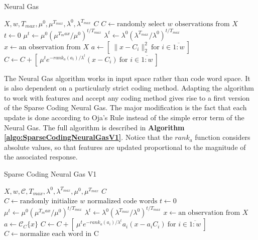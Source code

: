 \documentclass[runningheads,a4paper]{llncs}
\newcommand{\hcrange}[2]{\overline{{#1}\colon\!\!{#2}}}
\begin{document}
\begin{algorithm}
\caption{Neural Gas}
\label{algo:NeuralGas}
\begin{algorithmic}
\Require $X,w,T_{max},\mu^0,\mu^{T_{max}},\lambda^0,\lambda^{T_{max}}$
\Ensure $C$
\State $C \gets \mbox{randomly select $w$ observations from $X$}$
\State $t \gets 0$
\For {$t = \hcrange{1}{T_{max}}$}
\State $\mu^t \gets \mu^0 (\mu^{T_max} / \mu^0)^{t / T_{max}}$ 
\State $\lambda^t \gets \lambda^0 (\lambda^{T_{max}} / \lambda^0)^{t / T_{max}}$ 
\State $x \gets \text{an observation from $X$}$
\State $a \gets [ ~ \|x - C_i\|_2^2 ~ \mbox{for $i \in \hcrange{1}{w}$} ~ ]$
\State $C \gets C + [ ~ \mu^t e^{-rank_a(a_i) / \lambda^t} (x - C_i) ~ \mbox{for $i \in \hcrange{1}{w}$} ~ ]$
\EndFor
\end{algorithmic}
\end{algorithm}

The Neural Gas algorithm works in input space rather than code word space. It is also dependent on a particularly strict coding method. Adapting the algorithm to work with features and accept any coding method gives rise to a first version of the Sparse Coding Neural Gas. The major modification is the fact that each update is done according to Oja's Rule \cite{oja-rule} instead of the simple error term of the Neural Gas. The full algorithm is described in \textbf{Algorithm \ref{algo:SparseCodingNeuralGasV1}}. Notice that the $rank_a$ function considers absolute values, so that features are updated proportional to the magnitude of the associated response.

\begin{algorithm}
\caption{Sparse Coding Neural Gas V1}
\label{algo:SparseCodingNeuralGasV1}
\begin{algorithmic}
\Require $X,w,\mathcal{C},T_{max},\lambda^0,\lambda^{T_{max}},\mu^0,\mu^{T_{max}}$
\Ensure $C$
\State $C \gets \mbox{randomly initialize $w$ normalized code words}$
\State $t \gets 0$
\For {$t = \hcrange{1}{T_{max}}$}
\State $\mu^t \gets \mu^0 (\mu^{T_max} / \mu^0)^{t / T_{max}}$  
\State $\lambda^t \gets \lambda^0 (\lambda^{T_{max}} / \lambda^0)^{t / T_{max}}$ 
\State $x \gets \text{an observation from $X$}$
\State $a \gets \mathcal{C}_C\{ x \}$
\State $C \gets C + [ ~ \mu^t e^{-rank_a(a_i) / \lambda^t} a_i (x - a_i C_i) ~ \mbox{for $i \in \hcrange{1}{w}$} ~ ]$
\State $C \gets \mbox{normalize each word in C}$
\EndFor
\end{algorithmic}
\end{algorithm}
\end{document}
